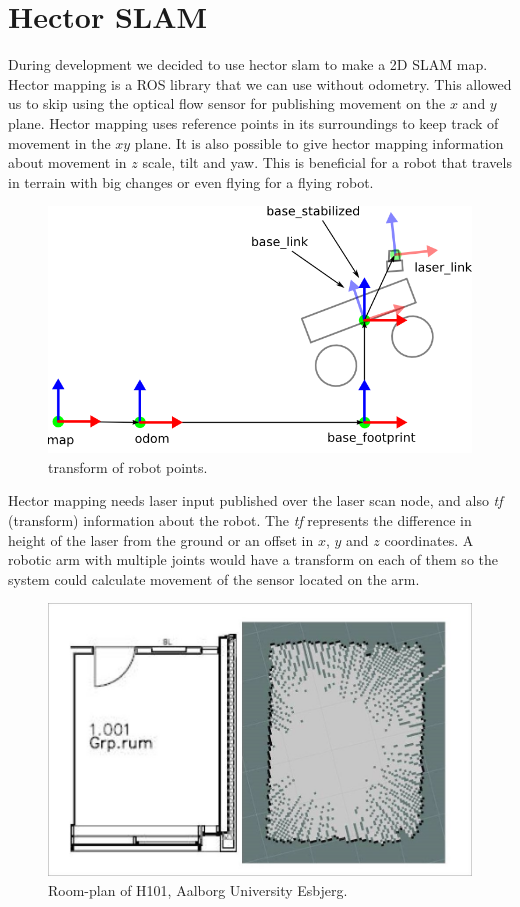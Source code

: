 \clearpage
\section{Hector SLAM}
During development we decided to use hector slam to make a 2D SLAM map. Hector mapping is a ROS library that we can use without odometry.\cite{hectormapping}
This allowed us to skip using the optical flow sensor for publishing movement on the $x$ and $y$ plane. Hector mapping uses reference points in its surroundings to keep track of movement in the $xy$ plane. It is also possible to give hector mapping information about movement in $z$ scale, tilt and yaw. This is beneficial for a robot that travels in terrain with big changes or even flying for a flying robot. 

\begin{figure}[H]
	\centering
	\includegraphics[width=.5\linewidth]{images/tf.png}
	\caption{transform of robot points.\cite{tfrobot}}
\end{figure}

Hector mapping needs laser input published over the laser scan node, and also \textit{tf} (transform) information about the robot. The \textit{tf} represents the difference in height of the laser from the ground or an offset in $x$, $y$ and $z$ coordinates. A robotic arm with multiple joints would have a transform on each of them so the system could calculate movement of the sensor located on the arm.

\begin{figure}[H]
	\centering
	\includegraphics[width=.5\linewidth]{images/compare.jpg}
	\caption{Room-plan of H101, Aalborg University Esbjerg.}
\end{figure}

